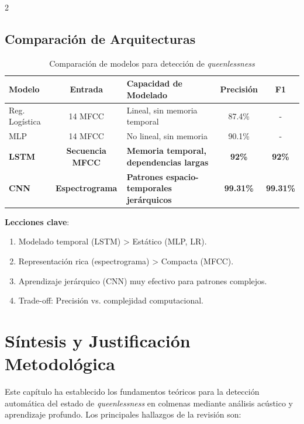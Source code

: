 \documentclass[12pt]{report}
\newenvironment{tightmulticols}{%
  \begin{multicols}{2}
  \setlength{\parskip}{1.2pt}
  \linespread{1}\selectfont
}{%
  \end{multicols}
}
\begin{document}
\begin{tightmulticols}
\subsection{Comparación de Arquitecturas}

\begin{table}[htbp]
\centering
\caption{Comparación de modelos para detección de \textit{queenlessness}}
\begin{tabular}{|l|c|p{3cm}|c|c|}
\hline
\textbf{Modelo} & \textbf{Entrada} & \textbf{Capacidad de Modelado} & \textbf{Precisión} & \textbf{F1} \\
\hline
Reg. Logística & 14 MFCC & Lineal, sin memoria temporal & 87.4\% & - \\
\hline
MLP & 14 MFCC & No lineal, sin memoria & 90.1\% & - \\
\hline
\textbf{LSTM} & \textbf{Secuencia MFCC} & \textbf{Memoria temporal, dependencias largas} & \textbf{92\%} & \textbf{92\%} \\
\hline
\textbf{CNN} & \textbf{Espectrograma} & \textbf{Patrones espacio-temporales jerárquicos} & \textbf{99.31\%} & \textbf{99.31\%} \\
\hline
\end{tabular}
\end{table}

\noindent\textbf{Lecciones clave}:
\begin{enumerate}
    \item Modelado temporal (LSTM) > Estático (MLP, LR).
    \item Representación rica (espectrograma) > Compacta (MFCC).
    \item Aprendizaje jerárquico (CNN) muy efectivo para patrones complejos.
    \item Trade-off: Precisión vs. complejidad computacional.
\end{enumerate}


\section{Síntesis y Justificación Metodológica}

\noindent Este capítulo ha establecido los fundamentos teóricos para la detección automática del estado de \textit{queenlessness} en colmenas mediante análisis acústico y aprendizaje profundo. Los principales hallazgos de la revisión son:


\end{tightmulticols}
\end{document}
